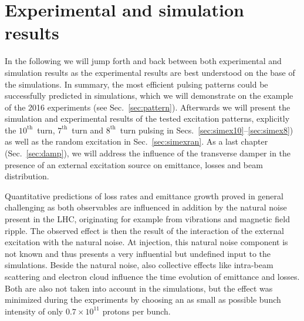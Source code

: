 \documentclass[%
 reprint,
 amsmath,amssymb,
 aps,
prstab,
]{revtex4-1}
\begin{document}
\section{Experimental and simulation results\label{sec:simex}}
In the following we will jump forth and back between both experimental and simulation results as the experimental results are best understood on the base of the simulations. In summary, the most efficient pulsing patterns could be successfully predicted in simulations, which we will demonstrate on the example of the 2016 experiments (see Sec.~\ref{sec:pattern}). Afterwards we will present the simulation and experimental results of the tested excitation patterns, explicitly the $10^{\mathrm{th}}$~turn, $7^{\mathrm{th}}$~turn and $8^{\mathrm{th}}$~turn pulsing in Secs.~\ref{sec:simex10}--\ref{sec:simex8}) as well as the random excitation in Sec.~\ref{sec:simexran}. As a last chapter (Sec.~\ref{sec:damp}), we will address the influence of the transverse damper in the presence of an external excitation source on emittance, losses and beam distribution.

Quantitative predictions of loss rates and emittance growth proved in general challenging as both observables are influenced in addition by the natural noise present in the LHC, originating for example from vibrations and magnetic field ripple. The observed effect is then the result of the interaction of the external excitation with the natural noise. At injection, this natural noise component is not known and thus presents a very influential but undefined input to the simulations. Beside the natural noise, also collective effects like intra-beam scattering and electron cloud influence the time evolution of emittance and losses. Both are also not taken into account in the simulations, but the effect was minimized during the experiments by choosing an as small as possible bunch intensity of only $0.7\times10^{11}$ protons per bunch.
\end{document}
